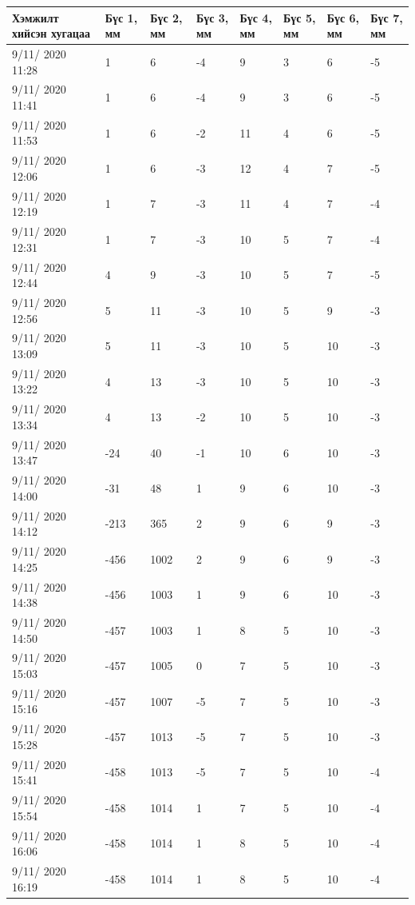 \begin{table}[h]
    \centering
    \begin{tabular}{|p{3cm}|p{1cm}|p{1cm}|p{1cm}|p{1cm}|p{1cm}|p{1cm}|p{1cm}|}
         \hline
     Хэмжилт хийсэн хугацаа & Бүс 1, мм&	Бүс 2, мм&	Бүс 3, мм&	Бүс 4, мм&	Бүс 5, мм&	Бүс 6, мм&	Бүс 7, мм  \\ \hline
9/11/ 2020 11:28&	1&	6&	-4&	9&	3&	6&	-5 \\ \hline
9/11/ 2020 11:41&	1&	6&	-4&	9&	3&	6&	-5 \\ \hline
9/11/ 2020 11:53&	1&	6&	-2&	11&	4&	6&	-5 \\ \hline
9/11/ 2020 12:06&	1&	6&	-3&	12&	4&	7&	-5 \\ \hline
9/11/ 2020 12:19&	1&	7&	-3&	11&	4&	7&	-4 \\ \hline
9/11/ 2020 12:31&	1&	7&	-3&	10&	5&	7&	-4 \\ \hline
9/11/ 2020 12:44&	4&	9&	-3&	10&	5&	7&	-5 \\ \hline
9/11/ 2020 12:56&	5&	11&	-3&	10&	5&	9&	-3 \\ \hline
9/11/ 2020 13:09&	5&	11&	-3&	10&	5&	10&	-3 \\ \hline
9/11/ 2020 13:22&	4&	13&	-3&	10&	5&	10&	-3 \\ \hline
9/11/ 2020 13:34&	4&	13&	-2&	10&	5&	10&	-3 \\ \hline
9/11/ 2020 13:47&	-24&	40&	    -1&	10&	6&	10&	-3 \\ \hline
9/11/ 2020 14:00&	-31&	48&	    1&	9&	6&	10&	-3 \\ \hline
9/11/ 2020 14:12&	-213&	365&	2&	9&	6&	9&	-3 \\ \hline
9/11/ 2020 14:25&	-456&	1002&	2&	9&	6&	9&	-3 \\ \hline
9/11/ 2020 14:38&	-456&	1003&	1&	9&	6&	10&	-3 \\ \hline
9/11/ 2020 14:50&	-457&	1003&	1&	8&	5&	10&	-3 \\ \hline
9/11/ 2020 15:03&	-457&	1005&	0&	7&	5&	10&	-3 \\ \hline
9/11/ 2020 15:16&	-457&	1007&	-5&	7&	5&	10&	-3 \\ \hline
9/11/ 2020 15:28&	-457&	1013&	-5&	7&	5&	10&	-3 \\ \hline
9/11/ 2020 15:41&	-458&	1013&	-5&	7&	5&	10&	-4 \\ \hline
9/11/ 2020 15:54&	-458&	1014&	1&	7&	5&	10&	-4 \\ \hline
9/11/ 2020 16:06&	-458&	1014&	1&	8&	5&	10&	-4 \\ \hline
9/11/ 2020 16:19&	-458&	1014&	1&	8&	5&	10&	-4 \\ \hline

\end{tabular}
\end{table}
